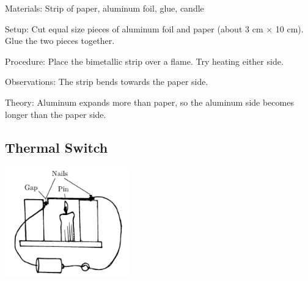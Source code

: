 \begin{multicols}{2}
\begin{description*}
\item[Materials:]{Strip of paper, aluminum foil, glue, candle}
\item[Setup:]{Cut equal size pieces of aluminum foil and paper (about 3 cm $\times$ 10 cm). Glue the two pieces together.}
\item[Procedure:]{Place the bimetallic strip over a flame. Try heating either side.}
\item[Observations:]{The strip bends towards the paper side.}
\item[Theory:]{Aluminum expands more than paper, so the aluminum side becomes longer than the paper side.}
\end{description*}

\subsection{Thermal Switch}

\begin{center}
\includegraphics[width=0.4\textwidth]{./img/thermal-switch.png}
\end{center}


\end{multicols}
